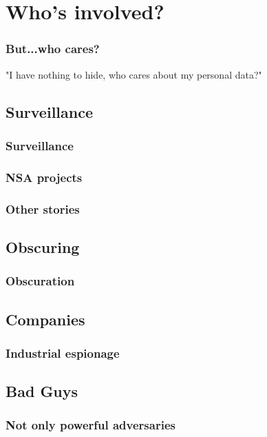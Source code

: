\section{Who's involved?}
\begin{frame}
	\frametitle{But...who cares?}
	\begin{center}
	\huge{"I have nothing to hide, who cares about my personal data?"}
	\end{center}

\end{frame}

\subsection{Surveillance} 
\begin{frame}
	\frametitle{Surveillance}
\end{frame}

\begin{frame}
	\frametitle{NSA projects}
\end{frame}

\begin{frame}
	\frametitle{Other stories}

\end{frame}

\subsection{Obscuring}
\begin{frame}
	\frametitle{Obscuration}
\end{frame}

\subsection{Companies} %
\begin{frame}
	\frametitle{Industrial espionage}
\end{frame}

\subsection{Bad Guys}
\begin{frame}
	\frametitle{Not only powerful adversaries}
\end{frame}
